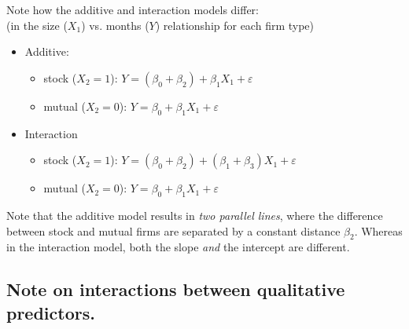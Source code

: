 \documentclass[12pt]{notes}
\begin{document}
\vspace{2em}

Note how the additive and interaction models differ:\\
(in the size ($X_1$) vs. months ($Y$) relationship for each firm type)
\begin{itemize}
 \item Additive:
  \begin{itemize}
    \item stock ($X_2=1$): $ Y  =  (\beta_0+\beta_2) + \beta_1 X_1 + \varepsilon $
    \item mutual ($X_2=0$): $Y  =  \beta_0 + \beta_1 X_1 + \varepsilon$
  \end{itemize}
 \item Interaction
  \begin{itemize}
    \item stock ($X_2=1$): $ Y  =  (\beta_0+\beta_2) + (\beta_1+\beta_3) X_1 + \varepsilon $
    \item mutual ($X_2=0$): $Y  =  \beta_0 + \beta_1 X_1 + \varepsilon$\\
  \end{itemize}
\end{itemize}

\nspace
Note that the additive model results in \textit{two parallel lines}, where the difference between stock and mutual firms are separated by a constant distance $\beta_2$. Whereas in the interaction model, both the slope \textit{and} the intercept are different. 

\subsection{Note on interactions between qualitative predictors.}








\end{document}
